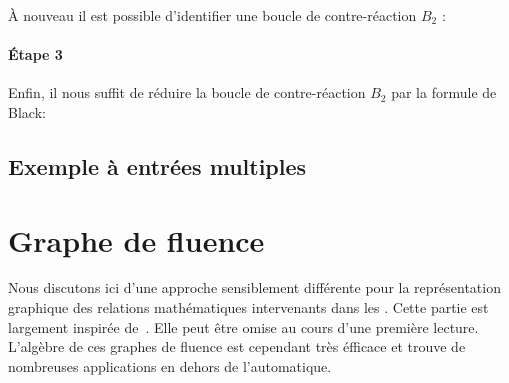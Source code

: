 \`A nouveau il est possible d'identifier une boucle de contre-réaction $B_2$ :

\begin{center}                                                                                                                
\end{center}                                                                                                                  

\paragraph{\'Etape 3}

Enfin, il nous suffit de réduire la boucle de contre-réaction $B_2$ par la formule de Black:

\begin{center}
\end{center}

\subsection{Exemple à entrées multiples}
\acpl
\newpage

\section{Graphe de fluence}
Nous discutons ici d'une approche sensiblement différente 
pour la représentation graphique des relations mathématiques 
intervenants dans les \SLCI. Cette partie est largement
inspirée de~\cite{Ostertag}. Elle peut être omise au cours 
d'une première lecture. L'algèbre de ces graphes de fluence
est cependant très éfficace et trouve de nombreuses applications 
en dehors de l'automatique. 

